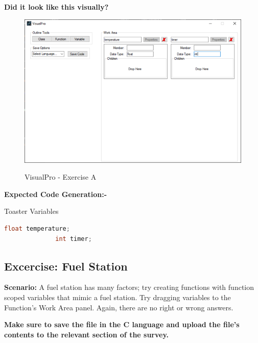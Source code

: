 \documentclass[10pt]{article}
\begin{document}
        \textbf{Did it look like this visually?}
          \begin{figure}[h]
            \centering
            {\includegraphics[scale=0.75]{Figures/Exercises/TutB-SecB-1.png}}
            \caption{VisualPro - Exercise A}
            \label{fig:vp-eA}
          \end{figure}

        \textbf{Expected Code Generation:-}
          \begin{example}{Toaster Variables}
            \begin{lstlisting}[language=c]
              float temperature;
              int timer;
            \end{lstlisting}
          \end{example}
    
    \newpage
    \subsection{Excercise: Fuel Station}
        \textbf{Scenario:} A fuel station has many factors; try creating functions with function scoped variables that mimic a fuel station. Try dragging variables to the Function's Work Area panel. Again, there are no right or wrong answers. 

        \textbf{Make sure to save the file in the C language and upload the file's contents to the relevant section of the survey.}
\end{document}
